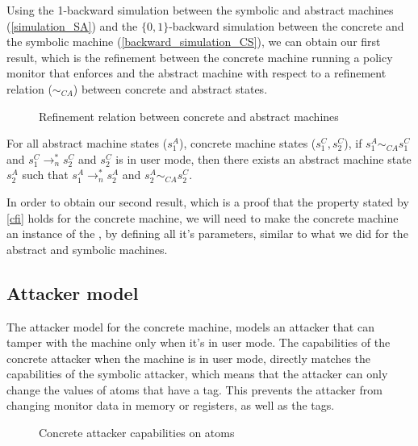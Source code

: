 Using the 1-backward simulation between the symbolic and abstract
machines (\cref{simulation_SA}) and the $\lbrace 0,1 \rbrace$-backward
simulation between the concrete and the symbolic machine
(\cref{backward_simulation_CS}), we can obtain our first result, which
is the refinement between the concrete machine running a policy
monitor that enforces \CFI and the abstract machine with respect
to a refinement relation ($\sim_{CA}$) between concrete and abstract states.

\begin{figure}[htb!]
\caption{Refinement relation between concrete and abstract machines}
\label{refinement_CA}
\end{figure}

\begin{theorem}
\label{backward_refinement_CA}
  For all abstract machine states ($s^A_1$), concrete machine states
  ($s^C_1, s^C_2$), if $s^A_1 \sim_{CA} s^C_1$ and
  $s^C_1 \to_n^{*} s^C_2$ and $s^C_2$ is in user mode, then
  there exists an abstract machine state $s^A_2$ such that
  $s^A_1 \to_n^{*} s^A_2$ and $s^A_2 \sim_{CA} s^C_2$.
\end{theorem}

In order to obtain our second result, which is a proof that the
property stated by \cref{cfi} holds for the concrete machine, we will
need to make the concrete machine an instance of
the , by defining all it's parameters, similar
to what we did for the abstract and symbolic machines.

\subsection{Attacker model}\label{sec:concrete_attacker}

The attacker model for the concrete machine, models an attacker that
can tamper with the machine only when it's in user mode. The
capabilities of the concrete attacker when the machine is in user
mode, directly matches the capabilities of the symbolic attacker,
which means that the attacker can only change the values of atoms that
have a \USERname tag. This prevents the attacker from changing monitor
data in memory or registers, as well as the tags.

\begin{figure}[htb!]
\caption{Concrete attacker capabilities on atoms}
\label{concrete_attacker_atom}
\end{figure}

